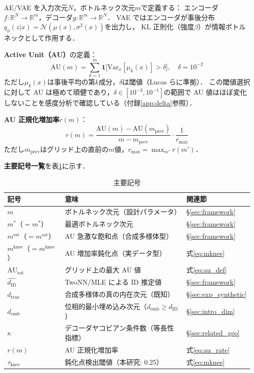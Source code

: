 \documentclass[11pt,a4paper]{jsarticle}
\newcommand{\dID}{d_{\mathrm{ID}}}
\newcommand{\dzopt}{m^*}
\newcommand{\dtrue}{d_{\mathrm{true}}}
\newcommand{\R}{\mathbb{R}}
\newcommand{\kap}{\kappa}
\newcommand{\AUsat}{\mathrm{AU}_{\mathrm{sat}}}
\newcommand{\dzsat}{m^{\mathrm{sat}}}
\newcommand{\mknee}{m^{\mathrm{knee}}}
\newcommand{\demb}{d_{\mathrm{emb}}}
\begin{document}
AE/VAE を入力次元$N$，ボトルネック次元$m$で定義する：
エンコーダ$f: \R^N \to \R^m$，デコーダ$g: \R^m \to \R^N$．
VAE ではエンコーダが事後分布$q_\phi(z|x) = \mathcal{N}(\mu(x), \sigma^2(x))$を出力し，
KL 正則化（強度$\beta$）が情報ボトルネックとして作用する．

\textbf{Active Unit（AU）}の定義：
\begin{equation}
  \mathrm{AU}(m) = \sum_{k=1}^{m} \mathbf{1}\bigl[\mathrm{Var}_x[\mu_k(x)] > \delta\bigr],
  \quad \delta = 10^{-2}
  \label{eq:au_def}
\end{equation}
ただし$\mu_k(x)$は事後平均の第$k$成分，$\delta$は閾値（Lucas ら\cite{lucas2019elbo}に準拠）．
この閾値選択に対して AU は極めて頑健であり，$\delta \in [10^{-3}, 10^{-1}]$の範囲で AU 値はほぼ変化しないことを感度分析で確認している（付録\ref{app:delta}参照）．

\textbf{AU 正規化増加率}$r(m)$：
\begin{equation}
  r(m) = \frac{\mathrm{AU}(m) - \mathrm{AU}(m_{\mathrm{prev}})}{m - m_{\mathrm{prev}}} \cdot \frac{1}{r_{\max}}
  \label{eq:au_rate}
\end{equation}
ただし$m_{\mathrm{prev}}$はグリッド上の直前の$m$値，$r_{\max} = \max_{m'} r(m')$．

\textbf{主要記号一覧}を表\ref{tab:notation}に示す．

\begin{table}[H]
\centering
\caption{主要記号}
\label{tab:notation}
\small
\begin{tabular}{lll}
\toprule
記号 & 意味 & 関連節 \\
\midrule
$m$ & ボトルネック次元（設計パラメータ） & §\ref{sec:framework} \\
$\dzopt$（$= m^*$） & 最適ボトルネック次元 & §\ref{sec:framework} \\
$\dzsat$（$= m^{\mathrm{sat}}$） & AU 急激な飽和点（合成多様体型） & §\ref{sec:framework} \\
$\mknee$（$= m^{\mathrm{knee}}$） & AU 増加率鈍化点（実データ型） & 式\eqref{eq:mknee} \\
$\AUsat$ & グリッド上の最大 AU 値 & 式\eqref{eq:au_def} \\
$\hat{\dID}$ & TwoNN/MLE による ID 推定値 & §\ref{sec:framework} \\
$\dtrue$ & 合成多様体の真の内在次元（既知） & §\ref{sec:exp_synthetic} \\
$\demb$ & 位相的最小埋め込み次元（$\demb \geq \dID$） & §\ref{sec:intro_dim} \\
$\kap$ & デコーダヤコビアン条件数（等長性指標） & §\ref{sec:related_geo} \\
$r(m)$ & AU 正規化増加率 & 式\eqref{eq:au_rate} \\
$\tau_{\mathrm{knee}}$ & 鈍化点検出閾値（本研究: 0.25） & 式\eqref{eq:mknee} \\
\bottomrule
\end{tabular}
\end{table}
\end{document}
